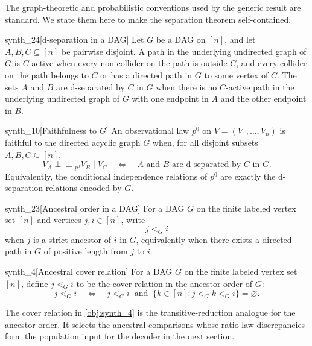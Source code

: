 The graph-theoretic and probabilistic conventions used by the generic result are standard. We state them here to make the separation theorem self-contained.

\begin{definitionv}{synth_24}[d-separation in a DAG]
Let \(G\) be a DAG on \([n]\), and let \(A,B,C\subseteq[n]\) be pairwise disjoint. A path in the underlying undirected graph of \(G\) is \(C\)-active when every non-collider on the path is outside \(C\), and every collider on the path belongs to \(C\) or has a directed path in \(G\) to some vertex of \(C\). The sets \(A\) and \(B\) are d-separated by \(C\) in \(G\) when there is no \(C\)-active path in the underlying undirected graph of \(G\) with one endpoint in \(A\) and the other endpoint in \(B\).
\end{definitionv}

\begin{definitionv}{synth_10}[Faithfulness to \(G\)]
An observational law \(p^0\) on \(V=(V_1,\ldots,V_n)\) is faithful to the directed acyclic graph \(G\) when, for all disjoint subsets \(A,B,C\subseteq[n]\),
\[
V_A\mathbin{\perp\!\!\!\perp}_{p^0} V_B \mid V_C
\quad\Longleftrightarrow\quad
A \text{ and } B \text{ are d-separated by } C \text{ in } G .
\]
Equivalently, the conditional independence relations of \(p^0\) are exactly the d-separation relations encoded by \(G\).
\end{definitionv}

\begin{definitionv}{synth_23}[Ancestral order in a DAG]
For a DAG \(G\) on the finite labeled vertex set \([n]\) and vertices \(j,i\in[n]\), write
\[
j<_G i
\]
when \(j\) is a strict ancestor of \(i\) in \(G\), equivalently when there exists a directed path in \(G\) of positive length from \(j\) to \(i\).
\end{definitionv}

\begin{definitionv}{synth_4}[Ancestral cover relation]
For a DAG \(G\) on the finite labeled vertex set \([n]\), define \(j\lessdot_G i\) to be the cover relation in the ancestor order of \(G\):
\[
j\lessdot_G i
\quad\Longleftrightarrow\quad
j <_G i
\;\;\text{and}\;\;
\{k\in[n]: j <_G k <_G i\}=\varnothing .
\]
\end{definitionv}

The cover relation in \cref{obj:synth_4} is the transitive-reduction analogue for the ancestor order. It selects the ancestral comparisons whose ratio-law discrepancies form the population input for the decoder in the next section.

